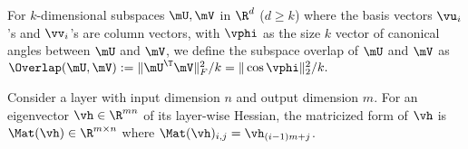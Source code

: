 \begin{definition}
For $k$-dimensional subspaces $\mU,\mV$ in $\R^d$ ($d\geq k$) where the basis vectors $\vu_i$'s and $\vv_i$'s are column vectors, with $\vphi$ as the size $k$ vector of canonical angles between $\mU$ and $\mV$, we define the subspace overlap of $\mU$ and $\mV$ as
$
    \Overlap(\mU, \mV) := \|\mU^\T\mV\|^2_F/k =\|\cos\vphi\|_2^2/k.
    $%
\label{def:overlap}
\end{definition}
\begin{definition} Consider a layer with input dimension $n$ and output dimension $m$. For an eigenvector $\vh\in\R^{mn}$ of its layer-wise Hessian, the matricized form of $\vh$ is $\Mat(\vh)\in\R^{m\times n}$ where $\Mat(\vh)_{i,j} = \vh_{(i-1)m+j}$.
\label{def:matricization}
\end{definition}